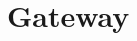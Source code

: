 \documentclass[../../dolphin-book-2020.tex]{subfiles}
\begin{document}
\section{Gateway}


\end{document}
